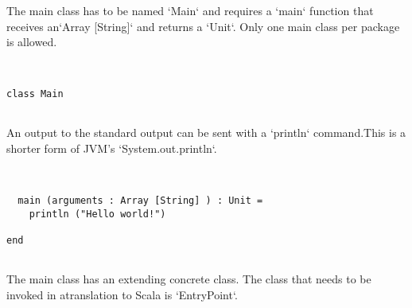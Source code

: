 \documentclass[12pt,a4paper]{article}
\begin{document}
The main class has to be named `Main` and requires a `main` function that receives an`Array [String]` and returns a `Unit`. Only one main class per package is allowed. 


\begin{lstlisting}


class Main


\end{lstlisting}

An output to the standard output can be sent with a `println` command.This is a shorter form of JVM's `System.out.println`. 


\begin{lstlisting}


  main (arguments : Array [String] ) : Unit =
    println ("Hello world!")

end


\end{lstlisting}

The main class has an extending concrete class. The class that needs to be invoked in atranslation to Scala is `EntryPoint`. 


\begin{lstlisting}


\end{lstlisting}
\end{document}
